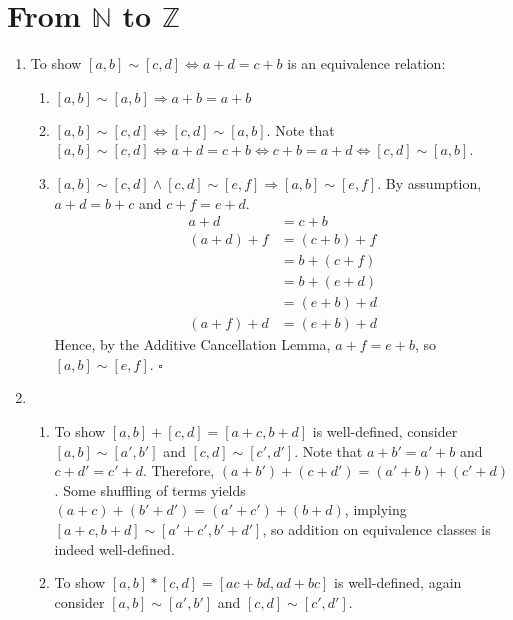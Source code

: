 \documentclass{article}
\begin{document}
\section{From $\mathbb{N}$ to $\mathbb{Z}$}
\begin{enumerate}[label=\textbf{(\alph*)}]
\item{
	To show $[a,b] \sim [c,d] \iff a+d=c+b$
	is an equivalence relation:
	\begin{enumerate}[label=(\arabic*)]
	\item{
		$[a,b] \sim [a,b] \Rightarrow a+b=a+b$
	}
	\item{
		$[a,b] \sim [c,d] \Leftrightarrow [c,d] \sim [a,b]$.
		Note that
		$[a,b]\sim[c,d]
			\Leftrightarrow a+d=c+b
			\Leftrightarrow c+b=a+d
			\Leftrightarrow [c,d]\sim[a,b]
		$.
	}
	\item{
		$[a,b]\sim[c,d]\wedge[c,d]\sim[e,f]\Rightarrow[a,b]\sim[e,f]$.
		By assumption, $a+d=b+c$ and $c+f=e+d$.
		\begin{align*}
			a+d &= c+b        \\
			(a+d)+f&=(c+b)+f  \\
			       &= b+(c+f)  \\
			       &= b+(e+d)  \\
			       &= (e+b)+d  \\
		   (a+f)+d &=(e+b)+d
		\end{align*}
		Hence, by the Additive Cancellation Lemma, $a+f=e+b$, so
		$[a,b]\sim[e,f]$.
		\hfill $\square$
	}
	\end{enumerate}
}
\item{
	\begin{enumerate}[label=(\arabic*)]
	\item{
		To show $[a,b]+[c,d]=[a+c,b+d]$ is well-defined,
		consider $[a,b]\sim[a',b']$ and
		$[c,d]\sim[c',d']$.
		Note that $a+b'=a'+b$ and $c+d'=c'+d$.
		Therefore,
		$(a+b')+(c+d')=(a'+b)+(c'+d)$.
		Some shuffling of terms yields
		$(a+c)+(b'+d')=(a'+c')+(b+d)$,
		implying
		$[a+c,b+d]\sim[a'+c',b'+d']$,
		so addition on equivalence classes is indeed
		well-defined.
	}
	\item{
		To show $[a,b]*[c,d]=[ac+bd,ad+bc]$ is well-defined,
		again consider $[a,b]\sim[a',b']$ and
		$[c,d]\sim[c',d']$.
		
}
\end{enumerate}}
\end{enumerate}
\end{document}
